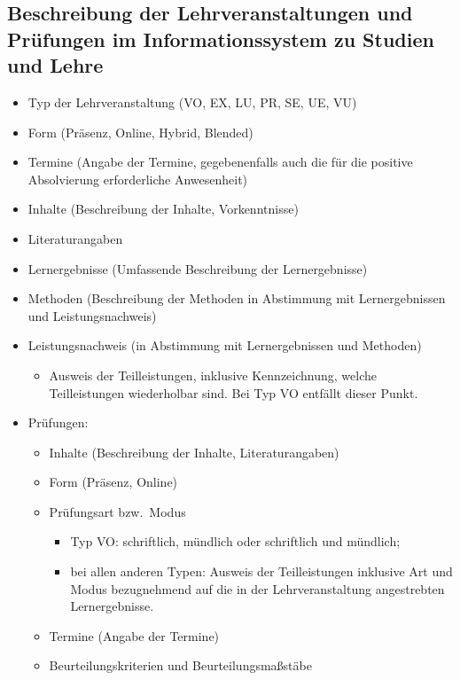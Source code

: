 \subsection*{Beschreibung der Lehrveranstaltungen und Prüfungen im Informationssystem zu Studien und Lehre}

\begin{itemize}
\item Typ der Lehrveranstaltung (VO, EX, LU, PR, SE, UE, VU)
\item Form (Präsenz, Online, Hybrid, Blended)
\item Termine (Angabe der Termine, gegebenenfalls auch die für die
  positive Absolvierung erforderliche Anwesenheit)
\item Inhalte (Beschreibung der Inhalte, Vorkenntnisse)
\item Literaturangaben
\item Lernergebnisse (Umfassende Beschreibung der Lernergebnisse)
\item Methoden (Beschreibung der Methoden in Abstimmung mit
  Lernergebnissen und Leistungsnachweis)
\item Leistungsnachweis (in Abstimmung mit Lernergebnissen und
  Methoden)
  \begin{itemize}
  \item Ausweis der Teilleistungen, inklusive Kennzeichnung, welche
    Teilleistungen wiederholbar sind.  Bei Typ VO entfällt dieser
    Punkt.
  \end{itemize}
\item Prüfungen:
  \begin{itemize}
  \item Inhalte (Beschreibung der Inhalte, Literaturangaben)
  \item Form (Präsenz, Online)
  \item Prüfungsart bzw.\ Modus
    \begin{itemize}
    \item Typ VO: schriftlich, mündlich oder schriftlich und
      mündlich;
    \item bei allen anderen Typen: Ausweis der Teilleistungen
      inklusive Art und Modus bezugnehmend auf die in der
      Lehrveranstaltung angestrebten Lernergebnisse.
    \end{itemize}
  \item Termine (Angabe der Termine)
  \item Beurteilungskriterien und Beurteilungsmaßstäbe
  \end{itemize}
\end{itemize}


